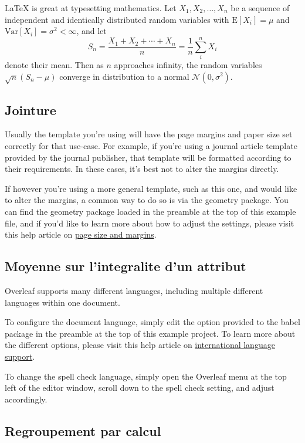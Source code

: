 \documentclass{article}
\begin{document}
\LaTeX{} is great at typesetting mathematics. Let $X_1, X_2, \ldots, X_n$ be a sequence of independent and identically distributed random variables with $\text{E}[X_i] = \mu$ and $\text{Var}[X_i] = \sigma^2 < \infty$, and let
\[S_n = \frac{X_1 + X_2 + \cdots + X_n}{n}
      = \frac{1}{n}\sum_{i}^{n} X_i\]
denote their mean. Then as $n$ approaches infinity, the random variables $\sqrt{n}(S_n - \mu)$ converge in distribution to a normal $\mathcal{N}(0, \sigma^2)$.


\subsection{Jointure}

Usually the template you're using will have the page margins and paper size set correctly for that use-case. For example, if you're using a journal article template provided by the journal publisher, that template will be formatted according to their requirements. In these cases, it's best not to alter the margins directly.

If however you're using a more general template, such as this one, and would like to alter the margins, a common way to do so is via the geometry package. You can find the geometry package loaded in the preamble at the top of this example file, and if you'd like to learn more about how to adjust the settings, please visit this help article on \href{https://www.overleaf.com/learn/latex/page_size_and_margins}{page size and margins}.

\subsection{Moyenne sur l'integralite d'un attribut}

Overleaf supports many different languages, including multiple different languages within one document. 

To configure the document language, simply edit the option provided to the babel package in the preamble at the top of this example project. To learn more about the different options, please visit this help article on \href{https://www.overleaf.com/learn/latex/International_language_support}{international language support}.

To change the spell check language, simply open the Overleaf menu at the top left of the editor window, scroll down to the spell check setting, and adjust accordingly.

\subsection{Regroupement par calcul}
\end{document}
